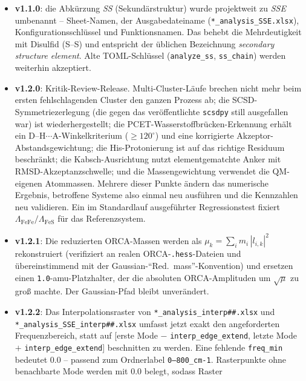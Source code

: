 \documentclass[11pt,a4paper,twoside]{article}
\theoremstyle{remark}
\begin{document}
\begin{infobox}
\begin{itemize}
  \item \textbf{v1.1.0}: die Abk\"urzung \emph{SS} (Sekund\"arstruktur)
        wurde projektweit zu \emph{SSE} umbenannt -- Sheet-Namen, der
        Ausgabedateiname (\texttt{*\_analysis\_SSE.xlsx}),
        Konfigurationsschl\"ussel und Funktionsnamen. Das behebt die
        Mehrdeutigkeit mit Disulfid (S--S) und entspricht der \"ublichen
        Bezeichnung \emph{secondary structure element}. Alte
        TOML-Schl\"ussel (\texttt{analyze\_ss}, \texttt{ss\_chain}) werden
        weiterhin akzeptiert.
  \item \textbf{v1.2.0}: Kritik-Review-Release. Multi-Cluster-L\"aufe
        brechen nicht mehr beim ersten fehlschlagenden Cluster den ganzen
        Prozess ab; die SCSD-Symmetriezerlegung (die gegen das
        ver\"offentlichte \texttt{scsdpy} still ausgefallen war) ist
        wiederhergestellt; die PCET-Wasserstoffbr\"ucken-Erkennung erh\"alt
        ein D--H$\cdots$A-Winkelkriterium ($\geq 120^\circ$) und eine
        korrigierte Akzeptor-Abstandsgewichtung; die His-Protonierung ist
        auf das richtige Residuum beschr\"ankt; die Kabsch-Ausrichtung nutzt
        elementgematchte Anker mit RMSD-Akzeptanzschwelle; und die
        Massengewichtung verwendet die QM-eigenen Atommassen. Mehrere dieser
        Punkte \"andern das numerische Ergebnis, betroffene Systeme also
        einmal neu ausf\"uhren und die Kennzahlen neu validieren. Ein im
        Standardlauf ausgef\"uhrter Regressionstest fixiert
        $\Lambda_\text{FeFe}/\Lambda_\text{FeS}$ f\"ur das Referenzsystem.
  \item \textbf{v1.2.1}: Die reduzierten ORCA-Massen werden als
        $\mu_k = \sum_i m_i\,|l_{i,k}|^2$ rekonstruiert (verifiziert an
        realen ORCA-\texttt{.hess}-Dateien und \"ubereinstimmend mit der
        Gaussian-``Red.\ mass''-Konvention) und ersetzen einen
        \texttt{1.0}-amu-Platzhalter, der die absoluten ORCA-Amplituden um
        $\sqrt{\mu}$ zu gro\ss{} machte. Der Gaussian-Pfad bleibt
        unver\"andert.
  \item \textbf{v1.2.2}: Das Interpolationsraster von
        \texttt{*\_analysis\_interp\#\#.xlsx} und
        \texttt{*\_analysis\_SSE\_interp\#\#.xlsx} umfasst jetzt exakt den
        angeforderten Frequenzbereich, statt auf
        [erste Mode $-$ \texttt{interp\_edge\_extend},
        letzte Mode $+$ \texttt{interp\_edge\_extend}] beschnitten zu
        werden. Eine fehlende \texttt{freq\_min} bedeutet $0.0$ -- passend
        zum Ordnerlabel \texttt{0--800\_cm-1}. Rasterpunkte ohne
        benachbarte Mode werden mit $0.0$ belegt, sodass Raster

\end{itemize}
\end{infobox}
\end{document}
